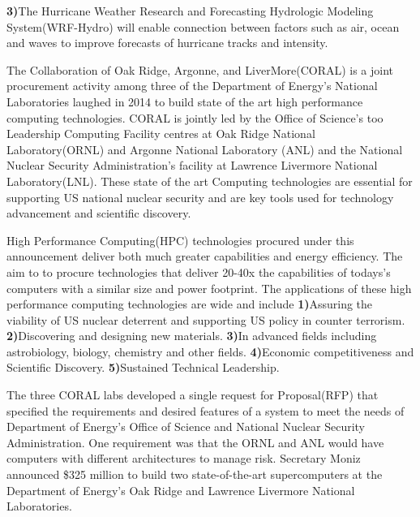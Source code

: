 \documentclass[fleqn,letterpaper,12pt]{report}
\begin{document}
\textbf{3)}The Hurricane Weather Research and Forecasting Hydrologic Modeling System(WRF-Hydro) will enable connection between factors such as air, ocean and waves to improve forecasts of hurricane tracks and intensity.
%
\newpage
{}
{}
\problem
The Collaboration of Oak Ridge, Argonne, and LiverMore(CORAL) is a joint procurement activity among three of the Department of Energy’s National Laboratories laughed in 2014 to build state of the art high performance computing technologies. CORAL is jointly led by the Office of Science’s too Leadership Computing Facility centres at Oak Ridge National Laboratory(ORNL) and Argonne  National Laboratory (ANL) and the National Nuclear Security Administration’s facility at Lawrence Livermore National Laboratory(LNL). These state of the art Computing technologies are essential for supporting US national nuclear security and are key tools used for technology advancement and scientific discovery.

High Performance Computing(HPC) technologies procured under this announcement deliver both much greater capabilities and energy efficiency. The aim to to procure technologies that deliver 20-40x the capabilities of todays’s computers with a similar size and power footprint. The applications of these high performance computing technologies are wide and include \newline
\textbf{1)}Assuring the viability of US nuclear deterrent and supporting US policy in counter terrorism.\newline
\textbf{2)}Discovering and designing new materials.\newline
\textbf{3)}In advanced fields including astrobiology, biology, chemistry and other fields.\newline
\textbf{4)}Economic competitiveness and Scientific Discovery.\newline
\textbf{5)}Sustained Technical Leadership.

The three CORAL labs developed a single request for Proposal(RFP) that specified the requirements and desired features of a system to meet the needs of Department of Energy’s Office of Science and National Nuclear Security Administration. One requirement was that the ORNL and ANL would have computers with different architectures to manage risk. Secretary Moniz announced \$325 million to build two state-of-the-art supercomputers at the Department of Energy’s Oak Ridge and Lawrence Livermore National Laboratories.\cite{ORL}
\end{document}
